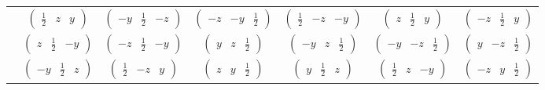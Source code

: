 \documentclass[fleqn,9pt,landscape]{jsarticle}
\begin{document}
\begin{center}
\begin{longtable}{ccccccc}
& $ \begin{pmatrix} \frac{1}{2} & z & y \end{pmatrix} $ & $ \begin{pmatrix} - y & \frac{1}{2} & - z \end{pmatrix} $ & $ \begin{pmatrix} - z & - y & \frac{1}{2} \end{pmatrix} $ & $ \begin{pmatrix} \frac{1}{2} & - z & - y \end{pmatrix} $ & $ \begin{pmatrix} z & \frac{1}{2} & y \end{pmatrix} $ & $ \begin{pmatrix} - z & \frac{1}{2} & y \end{pmatrix} $ \\
& $ \begin{pmatrix} z & \frac{1}{2} & - y \end{pmatrix} $ & $ \begin{pmatrix} - z & \frac{1}{2} & - y \end{pmatrix} $ & $ \begin{pmatrix} y & z & \frac{1}{2} \end{pmatrix} $ & $ \begin{pmatrix} - y & z & \frac{1}{2} \end{pmatrix} $ & $ \begin{pmatrix} - y & - z & \frac{1}{2} \end{pmatrix} $ & $ \begin{pmatrix} y & - z & \frac{1}{2} \end{pmatrix} $ \\
& $ \begin{pmatrix} - y & \frac{1}{2} & z \end{pmatrix} $ & $ \begin{pmatrix} \frac{1}{2} & - z & y \end{pmatrix} $ & $ \begin{pmatrix} z & y & \frac{1}{2} \end{pmatrix} $ & $ \begin{pmatrix} y & \frac{1}{2} & z \end{pmatrix} $ & $ \begin{pmatrix} \frac{1}{2} & z & - y \end{pmatrix} $ & $ \begin{pmatrix} - z & y & \frac{1}{2} \end{pmatrix} $ \\ \hline

\end{longtable}
\end{center}
\end{document}
